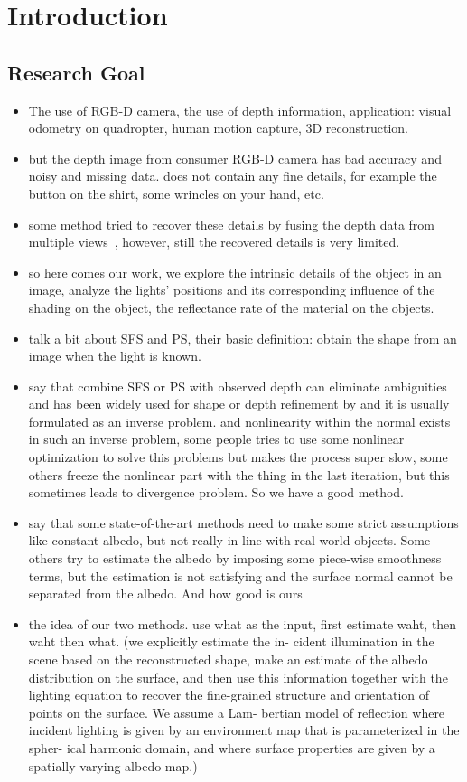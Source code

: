 \chapter{Introduction} \label{chap:intro}

\section{Research Goal}\label{sect:thefirst}
\begin{itemize}
    \item The use of RGB-D camera, the use of depth information, application: visual odometry on quadropter, human motion capture, 3D reconstruction.
    \item but the depth image from consumer RGB-D camera has bad accuracy and noisy and missing data. does not contain any fine details, for example the button on the shirt, some wrincles on your hand, etc.
    \item some method tried to recover these details by fusing the depth data from multiple views~\cite{newcombe2011kinectfusion}, however, still the recovered details is very limited.
    \item so here comes our work, we explore the intrinsic details of the object in an image, analyze the lights' positions and its corresponding influence of the shading on the object, the reflectance rate of the material on the objects.
    \item talk a bit about SFS and PS, their basic definition: obtain the shape from an image when the light is known. 
    \item say that combine SFS or PS with observed depth can eliminate ambiguities and has been widely used for shape or depth refinement by  and it is usually formulated as an inverse problem. and nonlinearity within the normal exists in such an inverse problem, some people tries to use some nonlinear optimization to solve this problems but makes the process super slow, some others freeze the nonlinear part with the thing in the last iteration, but this sometimes leads to divergence problem. So we have a good method.
    \item say that some state-of-the-art methods need to make some strict assumptions like constant albedo, but not really in line with real world objects. Some others try to estimate the albedo by imposing some piece-wise smoothness terms, but the estimation is not satisfying and the surface normal cannot be separated from the albedo. And how good is ours
    \item the idea of our two methods. use what as the input, first estimate waht, then waht then what. {\color{red}(we explicitly estimate the in- cident illumination in the scene based on the reconstructed shape, make an estimate of the albedo distribution on the surface, and then use this information together with the lighting equation to recover the fine-grained structure and orientation of points on the surface. We assume a Lam- bertian model of reflection where incident lighting is given by an environment map that is parameterized in the spher- ical harmonic domain, and where surface properties are given by a spatially-varying albedo map.)}
\end{itemize}

